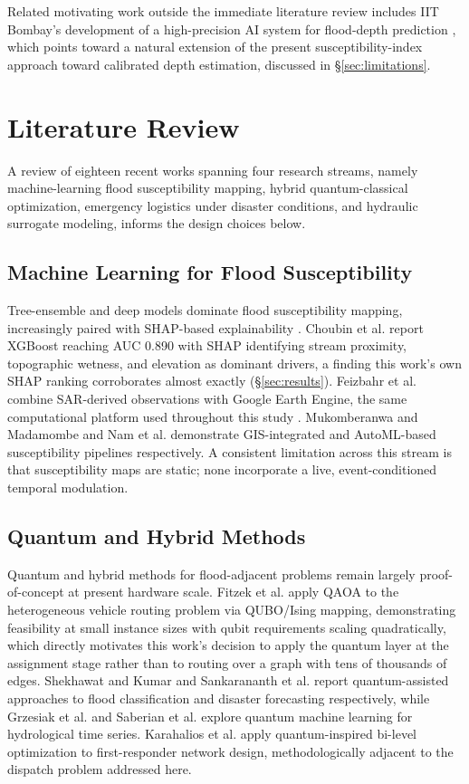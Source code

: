 \documentclass[conference]{IEEEtran}
\begin{document}
Related motivating work outside the immediate literature review includes IIT Bombay's development of a high-precision AI system for flood-depth prediction \cite{sadhwani2026}, which points toward a natural extension of the present susceptibility-index approach toward calibrated depth estimation, discussed in \S\ref{sec:limitations}.

\section{Literature Review}

A review of eighteen recent works spanning four research streams, namely machine-learning flood susceptibility mapping, hybrid quantum-classical optimization, emergency logistics under disaster conditions, and hydraulic surrogate modeling, informs the design choices below.

\subsection{Machine Learning for Flood Susceptibility}
Tree-ensemble and deep models dominate flood susceptibility mapping, increasingly paired with SHAP-based explainability \cite{saleem2025,liu2025,mukomberanwa2025,choubin2024,nam2025,bao2025,feizbahr2025}. Choubin et al. \cite{choubin2024} report XGBoost reaching AUC 0.890 with SHAP identifying stream proximity, topographic wetness, and elevation as dominant drivers, a finding this work's own SHAP ranking corroborates almost exactly (\S\ref{sec:results}). Feizbahr et al. \cite{feizbahr2025} combine SAR-derived observations with Google Earth Engine, the same computational platform used throughout this study \cite{gorelick2017}. Mukomberanwa and Madamombe \cite{mukomberanwa2025} and Nam et al. \cite{nam2025} demonstrate GIS-integrated and AutoML-based susceptibility pipelines respectively. A consistent limitation across this stream is that susceptibility maps are static; none incorporate a live, event-conditioned temporal modulation.

\subsection{Quantum and Hybrid Methods}
Quantum and hybrid methods for flood-adjacent problems remain largely proof-of-concept at present hardware scale. Fitzek et al. \cite{fitzek2024} apply QAOA to the heterogeneous vehicle routing problem via QUBO/Ising mapping, demonstrating feasibility at small instance sizes with qubit requirements scaling quadratically, which directly motivates this work's decision to apply the quantum layer at the assignment stage rather than to routing over a graph with tens of thousands of edges. Shekhawat and Kumar \cite{shekhawat2025} and Sankarananth et al. \cite{sankarananth2026} report quantum-assisted approaches to flood classification and disaster forecasting respectively, while Grzesiak et al. \cite{grzesiak2024} and Saberian et al. \cite{saberian2026} explore quantum machine learning for hydrological time series. Karahalios et al. \cite{karahalios2024} apply quantum-inspired bi-level optimization to first-responder network design, methodologically adjacent to the dispatch problem addressed here.
\end{document}
